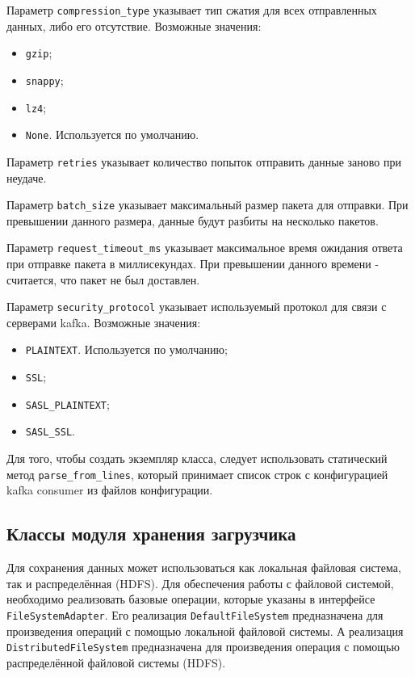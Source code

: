 Параметр \texttt{compression\_type} указывает тип сжатия для всех отправленных данных, либо его отсутствие.
Возможные значения:
\begin{itemize}
    \item \texttt{gzip};
    \item \texttt{snappy};
    \item \texttt{lz4};
    \item \texttt{None}. Используется по умолчанию.
\end{itemize}

Параметр \texttt{retries} указывает количество попыток отправить данные заново при неудаче.

Параметр \texttt{batch\_size} указывает максимальный размер пакета для отправки.
При превышении данного размера, данные будут разбиты на несколько пакетов.

Параметр \texttt{request\_timeout\_ms} указывает максимальное время ожидания ответа при отправке пакета в миллисекундах.
При превышении данного времени - считается, что пакет не был доставлен.

Параметр \texttt{security\_protocol} указывает используемый протокол для связи с серверами kafka.
Возможные значения:
\begin{itemize}
    \item \texttt{PLAINTEXT}. Используется по умолчанию;
    \item \texttt{SSL};
    \item \texttt{SASL\_PLAINTEXT};
    \item \texttt{SASL\_SSL}.
\end{itemize}

Для того, чтобы создать экземпляр класса, следует использовать статический метод \texttt{parse\_from\_lines}, который принимает список строк с конфигурацией kafka consumer из файлов конфигурации.

\subsection{Классы модуля хранения загрузчика}
Для сохранения данных может использоваться как локальная файловая система, так и распределённая (HDFS).
Для обеспечения работы с файловой системой, необходимо реализовать базовые операции, которые указаны в интерфейсе \texttt{FileSystemAdapter}.
Его реализация \texttt{DefaultFileSystem} предназначена для произведения операций с помощью локальной файловой системы.
А реализация \texttt{DistributedFileSystem} предназначена для произведения операция с помощью распределённой файловой системы (HDFS).

